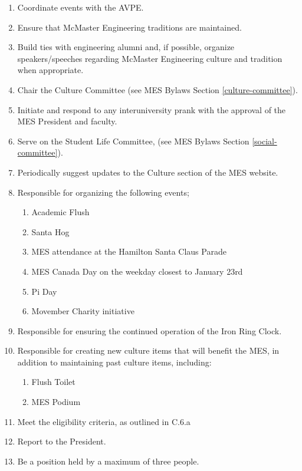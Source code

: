 \begin{enumerate}
 \item
  Coordinate events with the AVPE.
 \item
  Ensure that McMaster Engineering traditions are maintained.
 \item
  Build ties with engineering alumni and, if possible, organize speakers/speeches regarding McMaster Engineering culture and tradition when appropriate.
 \item
  Chair the Culture Committee (see MES Bylaws Section \ref{culture-committee}).
 \item
  Initiate and respond to any interuniversity prank with the approval of the MES President and faculty.
 \item
  Serve on the Student Life Committee, (see MES Bylaws Section \ref{social-committee}).
 \item
  Periodically suggest updates to the Culture section of the MES website.
 \item
  Responsible for organizing the following events;

  \begin{enumerate}
   \item
    Academic Flush
   \item
    Santa Hog
   \item
    MES attendance at the Hamilton Santa Claus Parade
   \item
    MES Canada Day on the weekday closest to January 23rd
   \item
    Pi Day
   \item
    Movember Charity initiative
  \end{enumerate}
 \item
  Responsible for ensuring the continued operation of the Iron Ring Clock.
 \item
  Responsible for creating new culture items that will benefit the MES, in addition to maintaining past culture items, including:

  \begin{enumerate}
   \item
    Flush Toilet
   \item
    MES Podium
  \end{enumerate}
 \item
  Meet the eligibility criteria, as outlined in C.6.a %
 \item
  Report to the President.
 \item
  Be a position held by a maximum of three people.

\end{enumerate}

